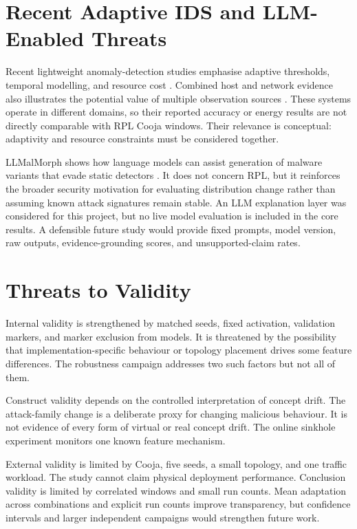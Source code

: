 \section{Recent Adaptive IDS and LLM-Enabled Threats}

Recent lightweight anomaly-detection studies emphasise adaptive thresholds, temporal modelling, and resource cost \cite{greenadaptive2026,trarw2026}. Combined host and network evidence also illustrates the potential value of multiple observation sources \cite{combinedids2026}. These systems operate in different domains, so their reported accuracy or energy results are not directly comparable with RPL Cooja windows. Their relevance is conceptual: adaptivity and resource constraints must be considered together.

LLMalMorph shows how language models can assist generation of malware variants that evade static detectors \cite{llmalmorph2025}. It does not concern RPL, but it reinforces the broader security motivation for evaluating distribution change rather than assuming known attack signatures remain stable. An LLM explanation layer was considered for this project, but no live model evaluation is included in the core results. A defensible future study would provide fixed prompts, model version, raw outputs, evidence-grounding scores, and unsupported-claim rates.

\section{Threats to Validity}

Internal validity is strengthened by matched seeds, fixed activation, validation markers, and marker exclusion from models. It is threatened by the possibility that implementation-specific behaviour or topology placement drives some feature differences. The robustness campaign addresses two such factors but not all of them.

Construct validity depends on the controlled interpretation of concept drift. The attack-family change is a deliberate proxy for changing malicious behaviour. It is not evidence of every form of virtual or real concept drift. The online sinkhole experiment monitors one known feature mechanism.

External validity is limited by Cooja, five seeds, a small topology, and one traffic workload. The study cannot claim physical deployment performance. Conclusion validity is limited by correlated windows and small run counts. Mean adaptation across combinations and explicit run counts improve transparency, but confidence intervals and larger independent campaigns would strengthen future work.

